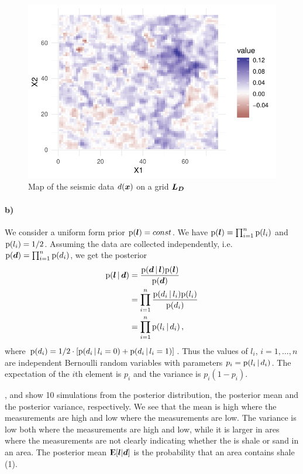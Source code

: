 \begin{figure}
    \centering
    \includegraphics[scale=0.95]{figures/seismic_data.pdf}
    \caption{Map of the seismic data $d(\bm{x})$ on a grid $\bm{L_D}$}
    \label{fig:data}
\end{figure}
\paragraph{b)}
We consider a uniform form prior $\mathrm{p}(\bm{l}) = const$. We have $\mathrm{p}(\bm{l}) = \prod_{i=1}^n \mathrm{p}(l_i)$ and $\mathrm{p}(l_i) = 1/2$. Assuming the data are collected independently, i.e. $\mathrm{p}(\bm{d}) = \prod_{i=1}^n \mathrm{p}(d_i)$, we get the posterior
%
\begin{align*}
    \mathrm{p}(\bm{l} \, | \, \bm{d}) &= \frac{\mathrm{p}(\bm{d} \, | \, \bm{l}) \mathrm{p}(\bm{l})}{\mathrm{p}(\bm{d})} \\
    &= \prod_{i=1}^n \frac{\mathrm{p}(d_i \, | \, l_i) \mathrm{p}(l_i)}{\mathrm{p}(d_i)} \\
    &= \prod_{i=1}^n \mathrm{p}(l_i \, | \, d_i) \, ,
\end{align*}
%
where $\mathrm{p}(d_i) = 1/2 \cdot [\mathrm{p}(d_i \, | \, l_i=0) + \mathrm{p}(d_i \, | \, l_i=1)]$. Thus the values of $l_i$, $i = 1, \dots, n$ are independent Bernoulli random variables with parameters $p_i = \mathrm{p}(l_i \, | \, d_i)$. The expectation of the $i$th element is $p_i$ and the variance is $p_i(1-p_i)$. 

,  and  show 10 simulations from the posterior distribution, the posterior mean and the posterior variance, respectively. We see that the mean is high where the measurements are high and low where the measurements are low. The variance is low both where the measurements are high and low, while it is larger in ares where the measurements are not clearly indicating whether the is shale or sand in an area. The posterior mean ${\rm I\kern-.3em E}[\bm{l} | \bm{d}]$ is the probability that an area contains shale (1).

